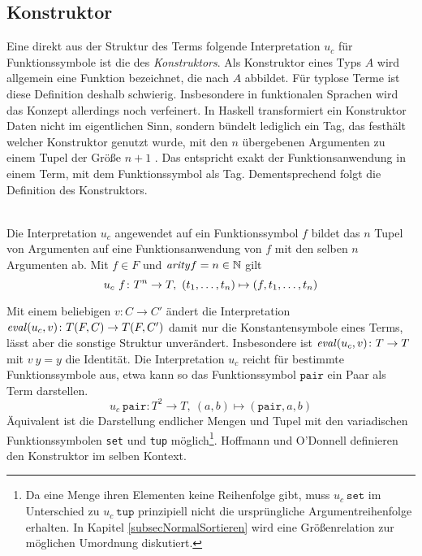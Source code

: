 \subsection{Konstruktor}
Eine direkt aus der Struktur des Terms folgende Interpretation $u_c$ für Funktionssymbole ist die des \emph{Konstruktors}. Als Konstruktor eines Typs $A$ wird allgemein eine Funktion bezeichnet, die nach $A$ abbildet. Für typlose Terme ist diese Definition deshalb schwierig. 
Insbesondere in funktionalen Sprachen wird das Konzept allerdings noch verfeinert. In Haskell transformiert ein Konstruktor Daten nicht im eigentlichen Sinn, sondern bündelt lediglich ein Tag, das festhält welcher Konstruktor genutzt wurde, mit den $n$ übergebenen Argumenten zu einem Tupel der Größe $n+1$ \cite{haskellConstructor}. Das entspricht exakt der Funktionsanwendung in einem Term, mit dem Funktionssymbol als Tag. Dementsprechend folgt die Definition des Konstruktors.

\begin{definition}~\\
Die Interpretation $u_c$ angewendet auf ein Funktionssymbol $f$ bildet das $n$ Tupel von Argumenten auf eine Funktionsanwendung von $f$ mit den selben $n$ Argumenten ab. 
 Mit $f \in F$ und $\mathit{arity} f = n \in \mathbb N$ 
gilt 
$$u_c~f \colon T^n \rightarrow T, ~({t}_{1}, \dots, {t}_{n}) \mapsto (f, {t}_{1}, \dots, {t}_{n})$$
\end{definition}

Mit einem beliebigen $v \colon C \rightarrow C'$ ändert die Interpretation {$\mathit{eval}(u_c, v) \colon T(F, C) \rightarrow T(F, C')$} damit nur die Konstantensymbole eines Terms, lässt aber die sonstige Struktur unverändert. Insbesondere ist $\mathit{eval}(u_c, v) \colon T \rightarrow T$ mit $v~y = y$ die Identität.
Die Interpretation $u_c$ reicht für bestimmte Funktionssymbole aus, etwa kann so das Funktionssymbol $\texttt{pair}$ ein Paar als Term darstellen.
$$u_c~\texttt{pair} \colon T^2 \rightarrow T, ~(a, b) \mapsto (\texttt{pair}, a, b)$$
Äquivalent ist die Darstellung endlicher Mengen und Tupel mit den variadischen Funktionssymbolen \texttt{set} und \texttt{tup} möglich\footnote{Da eine Menge ihren Elementen keine Reihenfolge gibt, muss $u_c~\texttt{set}$ im Unterschied zu $u_c~\texttt{tup}$ prinzipiell nicht die ursprüngliche Argumentreihenfolge erhalten. In Kapitel \ref{subsecNormalSortieren} wird eine Größenrelation zur möglichen Umordnung diskutiert.}. 
Hoffmann und O'Donnell \cite{hoffmann1982programming} definieren den Konstruktor im selben Kontext.


